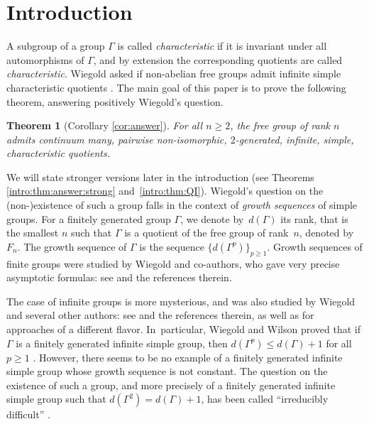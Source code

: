\documentclass[11pt]{article}
\newtheorem{theorem}{Theorem}[section]
\theoremstyle{definition}
\begin{document}
\section{Introduction}

A subgroup of a group $\Gamma$ is called \emph{characteristic} if it is invariant under all automorphisms of $\Gamma$, and by extension the corresponding quotients are called \emph{characteristic}.
Wiegold asked if non-abelian free groups admit infinite simple characteristic quotients \cite[Quest.\,6.45]{kourovka}.
The main goal of this paper is to prove the following theorem, answering positively Wiegold's question.

\begin{theorem}[Corollary \ref{cor:answer}]
\label{intro:thm:answer}
For all $n \geq 2$, the free group of rank $n$ admits continuum many, pairwise non-isomorphic, $2$-generated, infinite, simple, characteristic quotients.
\end{theorem}

We will state stronger versions later in the introduction (see Theorems \ref{intro:thm:answer:strong} and~\ref{intro:thm:QI}).
Wiegold's question on the (non-)existence of such a group falls in the context of \emph{growth sequences} of simple groups. For a finitely generated group $\Gamma$, we denote by~$d(\Gamma)$ its rank, that is the smallest $n$ such that $\Gamma$ is a quotient of the free group of rank~$n$, denoted by $F_n$. The growth sequence of $\Gamma$ is the sequence $\{ d(\Gamma^p) \}_{p \geq 1}$.
Growth sequences of finite groups were studied by Wiegold and co-authors, who gave very precise asymptotic formulas: see \cite{w:finite1, w:finite6} and the references therein.

The case of infinite groups is more mysterious, and was also studied by Wiegold and several other authors: see \cite{obratsov, erfanian} and the references therein, as well as \cite{wise, bridson} for approaches of a different flavor. In~particular, Wiegold and Wilson proved that if $\Gamma$ is a finitely generated infinite simple group, then $d(\Gamma^p) \leq d(\Gamma) + 1$ for all $p \geq 1$ \cite{w:fg1}. However, there seems to be no example of a finitely generated infinite simple group whose growth sequence is not constant. The question on the existence of such a group, and more precisely of a finitely generated infinite simple group such that $d(\Gamma^2) = d(\Gamma) + 1$, has been called ``irreducibly difficult'' \cite{w:fg1, obratsov}.
\end{document}
